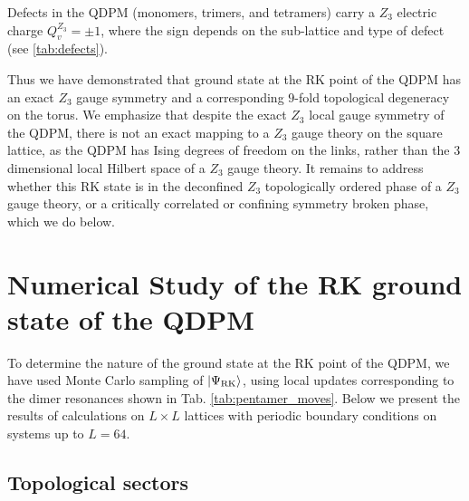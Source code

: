 \documentclass[twocolumn,prb,aps,floatfix,superscriptaddress]{revtex4-1}
\newcommand{\tabref}[1]{Tab. \ref{#1}}
\newcommand{\ket}[1]{| #1 \rangle}
\begin{document}
Defects in the QDPM (monomers, trimers, and tetramers) carry a $Z_3$ electric charge $Q_v^{Z_3} = \pm 1$, where the sign depends on the sub-lattice and type of defect (see \ref{tab:defects}).

Thus we have demonstrated that ground state at the RK point of the QDPM has an exact $Z_3$ gauge symmetry and a corresponding $9$-fold topological degeneracy on the torus. We emphasize that despite the exact $Z_3$ local gauge symmetry of the QDPM, there is not an exact mapping to a $Z_3$ gauge theory on the square lattice, as the QDPM has Ising degrees of freedom on the links, rather than the 3 dimensional local Hilbert space of a $Z_3$ gauge theory.  It remains to address whether this RK state is in the deconfined $Z_3$ topologically ordered phase of a $Z_3$ gauge theory, or a critically correlated or confining symmetry broken phase, which we do below.


\section{Numerical Study of the RK ground state of the QDPM}
\label{sec:numerics}

To determine the nature of the ground state at the RK point of the QDPM, we have used Monte Carlo sampling of $\ket{\Psi_{\rm{RK}}}$, using local updates corresponding to the dimer resonances shown in \tabref{tab:pentamer_moves}. Below we present the results of calculations on $L\times L$ lattices with periodic boundary conditions on systems up to $L=64$. 

\subsection{Topological sectors}
\end{document}
